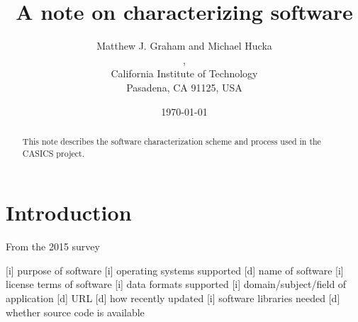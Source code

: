 \documentclass{casicswhitepaper}
\begin{document}
\title{A note on characterizing software}
\date{\today}
\author{Matthew J. Graham and Michael Hucka\\
,\quad{}\\
California Institute of Technology\\
Pasadena, CA 91125, USA}
\maketitle

\begin{abstract}
This note describes the software characterization scheme and process used in the CASICS project.
\end{abstract}


\section{Introduction}

From the 2015 survey 

[i]  purpose of software
[i]  operating systems supported
[d]  name of software
[i]  license terms of software
[i]  data formats supported
[i]  domain/subject/field of application
[d]  URL
[d]  how recently updated
[i]  software libraries needed
[d]  whether source code is available


\clearpage



%
%
\end{document}

